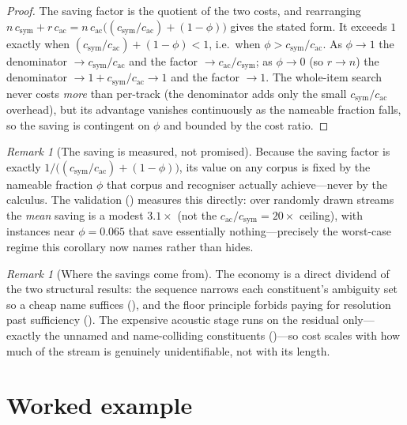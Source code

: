 \documentclass[11pt,twocolumn,a4paper]{article}
\theoremstyle{thmstyle}
\theoremstyle{definition}
\theoremstyle{remark}
\newtheorem{remark}[theorem]{Remark}
\begin{document}
\begin{proof}
The saving factor is the quotient of the two costs, and rearranging
$n\,c_{\mathrm{sym}}+r\,c_{\mathrm{ac}}=n\,c_{\mathrm{ac}}\bigl((c_{\mathrm{sym}}/
c_{\mathrm{ac}})+(1-\phi)\bigr)$ gives the stated form. It exceeds $1$ exactly
when $(c_{\mathrm{sym}}/c_{\mathrm{ac}})+(1-\phi)<1$, i.e.\ when
$\phi>c_{\mathrm{sym}}/c_{\mathrm{ac}}$. As $\phi\to1$ the denominator
$\to c_{\mathrm{sym}}/c_{\mathrm{ac}}$ and the factor $\to c_{\mathrm{ac}}/
c_{\mathrm{sym}}$; as $\phi\to0$ (so $r\to n$) the denominator $\to
1+c_{\mathrm{sym}}/c_{\mathrm{ac}}\to1$ and the factor $\to1$. The whole-item
search never costs \emph{more} than per-track (the denominator adds only the
small $c_{\mathrm{sym}}/c_{\mathrm{ac}}$ overhead), but its advantage vanishes
continuously as the nameable fraction falls, so the saving is contingent on
$\phi$ and bounded by the cost ratio.
\end{proof}

\begin{remark}[The saving is measured, not promised]
\label{rem:phi-empirical}
Because the saving factor is exactly $1/\bigl((c_{\mathrm{sym}}/c_{\mathrm{ac}})+
(1-\phi)\bigr)$, its value on any corpus is fixed by the nameable fraction
$\phi$ that corpus and recogniser actually achieve---never by the calculus. The
validation () measures this directly: over randomly drawn
streams the \emph{mean} saving is a modest $3.1\times$ (not the $c_{\mathrm{ac}}/
c_{\mathrm{sym}}=20\times$ ceiling), with instances near $\phi=0.065$ that save
essentially nothing---precisely the worst-case regime this corollary now names
rather than hides.
\end{remark}

\begin{remark}[Where the savings come from]
\label{rem:savings}
The economy is a direct dividend of the two structural results: the sequence
narrows each constituent's ambiguity set so a cheap name suffices
(), and the floor principle forbids paying for resolution past
sufficiency (). The expensive acoustic stage runs on the
residual only---exactly the unnamed and name-colliding constituents
()---so cost scales with how much of the stream is genuinely
unidentifiable, not with its length.
\end{remark}

\section{Worked example}
\label{sec:example}
\end{document}
